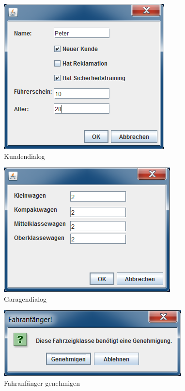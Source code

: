 \begin{figure}
	\centering
	\includegraphics[width=0.7\linewidth]{Bilder/Screenshots/kunde}
	\caption{Kundendialog}
	\label{fig:kunde}
\end{figure}

\begin{figure}
	\centering
	\includegraphics[width=0.7\linewidth]{Bilder/Screenshots/Garage}
	\caption{Garagendialog}
	\label{fig:Garage}
\end{figure}

\begin{figure}
	\centering
	\includegraphics[width=0.7\linewidth]{Bilder/Screenshots/Fahranfanger}
	\caption{Fahranfänger genehmigen}
	\label{fig:Fahränfanger}
\end{figure}

